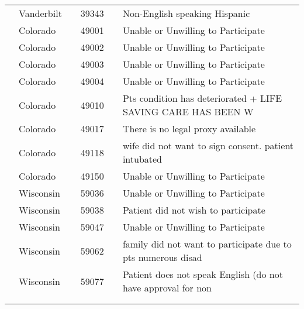 \documentclass[dvips, 10pt]{article}
\begin{document}
\begin{table}[t]
\begin{center}
\begin{tabular}{ @{}l@{}
@{}l@{}@{}p{1.5em}@{}@{}c@{}@{}p{1.5em}@{}@{}l@{}
}
& Vanderbilt && 39343 && Non-English speaking Hispanic \\
& Colorado && 49001 && Unable or Unwilling to Participate \\
& Colorado && 49002 && Unable or Unwilling to Participate \\
& Colorado && 49003 && Unable or Unwilling to Participate \\
& Colorado && 49004 && Unable or Unwilling to Participate \\
& Colorado && 49010 && Pts condition has deteriorated + LIFE SAVING CARE HAS BEEN W \\
& Colorado && 49017 && There is no legal proxy available \\
& Colorado && 49118 && wife did not want to sign consent. patient intubated \\
& Colorado && 49150 && Unable or Unwilling to Participate \\
& Wisconsin && 59036 && Unable or Unwilling to Participate \\
& Wisconsin && 59038 && Patient did not wish to participate \\
& Wisconsin && 59047 && Unable or Unwilling to Participate \\
& Wisconsin && 59062 && family did not want to participate due to pts numerous disad \\
& Wisconsin && 59077 && Patient does not speak English (do not have approval for non \\
\\
\hline \\

\end{tabular}

\end{center}
 \end{table}
\clearpage
\end{document}
